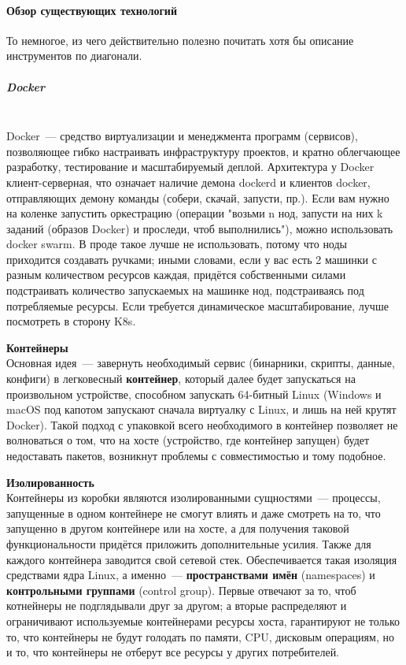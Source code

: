 \paragraph{Обзор существующих технологий}
То немногое, из чего действительно полезно почитать хотя бы описание инструментов по диагонали.

\subparagraph{Docker} ~\\

    Docker~--- средство виртуализации и менеджмента программ (сервисов), позволяющее гибко настраивать инфраструктуру проектов, и кратно облегчающее разработку, тестирование и масштабируемый деплой. Архитектура у Docker клиент-серверная, что означает наличие демона dockerd и клиентов docker, отправляющих демону команды (собери, скачай, запусти, пр.). Если вам нужно на коленке запустить оркестрацию (операции "возьми n нод, запусти на них k заданий (образов Docker) и проследи, чтоб выполнились"), можно использовать docker swarm.\autocite{DockerSwarmConcepts} В проде такое лучше не использовать, потому что ноды приходится создавать ручками; иными словами, если у вас есть 2 машинки с разным количеством ресурсов каждая, придётся собственными силами подстраивать количество запускаемых на машинке нод, подстраиваясь под потребляемые ресурсы. Если требуется динамическое масштабирование, лучше посмотреть в сторону K8s.

    \textbf{Контейнеры} ~\\
    Основная идея~--- завернуть необходимый сервис (бинарники, скрипты, данные, конфиги) в легковесный \textbf{контейнер}, который далее будет запускаться на произвольном устройстве, способном запускать 64-битный Linux (Windows и macOS под капотом запускают сначала виртуалку с Linux, и лишь на ней крутят Docker). Такой подход с упаковкой всего необходимого в контейнер позволяет не волноваться о том, что на хосте (устройство, где контейнер запущен) будет недоставать пакетов, возникнут проблемы с совместимостью и тому подобное.

    \textbf{Изолированность} ~\\
    Контейнеры из коробки являются изолированными сущностями~--- процессы, запущенные в одном контейнере не смогут влиять и даже смотреть на то, что запущенно в другом контейнере или на хосте, а для получения таковой функциональности придётся приложить дополнительные усилия. Также для каждого контейнера заводится свой сетевой стек.
    Обеспечивается такая изоляция средствами ядра Linux, а именно~--- \textbf{пространствами имён} (namespaces) и \textbf{контрольными группами} (control group). Первые отвечают за то, чтоб котнейнеры не подглядывали друг за другом; а вторые распределяют и ограничивают используемые контейнерами ресурсы хоста, гарантируют не только то, что контейнеры не будут голодать по памяти, CPU, дисковым операциям, но и то, что контейнеры не отберут все ресурсы у других потребителей.

